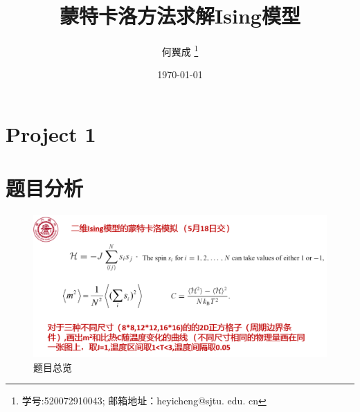 \documentclass[UTF8,a4paper,10pt]{ctexart}
\title{\textbf{蒙特卡洛方法求解Ising模型}}
\author{ 何翼成 \thanks{学号:520072910043; \newline
    邮箱地址：heyicheng@sjtu. edu. cn} }
\date{\today}
\begin{document}
\maketitle

\section*{Project 1}
\section{题目分析}
	\begin{figure}[!htbp]
		\centering
		\includegraphics[width=1\textwidth,height=0.6\textwidth]{pictures/pro.png}
		\caption{题目总览} \label{project1}
	\end{figure}
\end{document}
